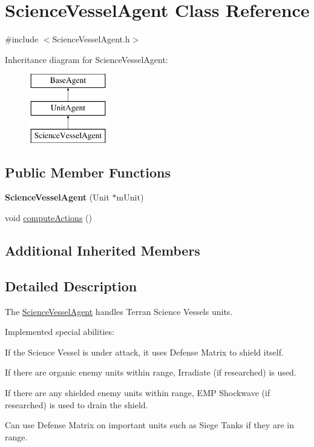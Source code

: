 \hypertarget{class_science_vessel_agent}{\section{Science\-Vessel\-Agent Class Reference}
\label{class_science_vessel_agent}
}


{\ttfamily \#include $<$Science\-Vessel\-Agent.\-h$>$}

Inheritance diagram for Science\-Vessel\-Agent\-:\begin{figure}[H]
\begin{center}
\leavevmode
\includegraphics[height=3.000000cm]{class_science_vessel_agent}
\end{center}
\end{figure}
\subsection*{Public Member Functions}
\begin{DoxyCompactItemize}
\item 
\hypertarget{class_science_vessel_agent_a0a6cb5965c9b012a1922567cd3826456}{{\bfseries Science\-Vessel\-Agent} (Unit $\ast$m\-Unit)}\label{class_science_vessel_agent_a0a6cb5965c9b012a1922567cd3826456}

\item 
void \hyperlink{class_science_vessel_agent_a585ba9344d8ceed21b809ee6f4c0896e}{compute\-Actions} ()
\end{DoxyCompactItemize}
\subsection*{Additional Inherited Members}


\subsection{Detailed Description}
The \hyperlink{class_science_vessel_agent}{Science\-Vessel\-Agent} handles Terran Science Vessels units.

Implemented special abilities\-:
\begin{DoxyItemize}
\item If the Science Vessel is under attack, it uses Defense Matrix to shield itself.
\item If there are organic enemy units within range, Irradiate (if researched) is used.
\item If there are any shielded enemy units within range, E\-M\-P Shockwave (if researched) is used to drain the shield.
\item Can use Defense Matrix on important units such as Siege Tanks if they are in range.
\end{DoxyItemize}

